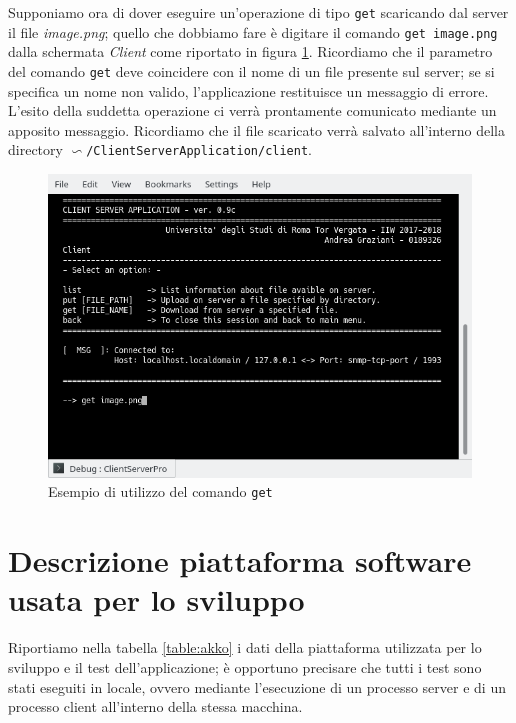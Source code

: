 \documentclass[10pt,a4paper, titlepage]{report}
\begin{document}
Supponiamo ora di dover eseguire un'operazione di tipo \texttt{get} scaricando dal server il file \textit{image.png}; quello che dobbiamo fare è digitare il comando \texttt{get image.png} dalla schermata \textit{Client} come riportato in figura \ref{fig:example3}. Ricordiamo che il parametro del comando \texttt{get} deve coincidere con il nome di un file presente sul server; se si specifica un nome non valido, l'applicazione restituisce un messaggio di errore. L'esito della suddetta operazione ci verrà prontamente comunicato mediante un apposito messaggio.
Ricordiamo che il file scaricato verrà salvato all'interno della directory \texttt{$\backsim$/ClientServerApplication/client}.

\begin{figure}
\centering
\includegraphics[width=\textwidth, height=0.3\textheight]{Example3}
\caption{Esempio di utilizzo del comando \texttt{get}}
\label{fig:example3}
\end{figure}

\newpage
\section{Descrizione piattaforma software usata per lo sviluppo}

Riportiamo nella tabella \ref{table:akko} i dati della piattaforma utilizzata per lo sviluppo e il test dell'applicazione; è opportuno precisare che tutti i test sono stati eseguiti in locale, ovvero mediante l'esecuzione di un processo server e di un processo client all'interno della stessa macchina.
\end{document}
